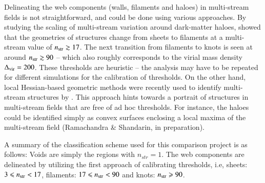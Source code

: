 Delineating the web components (walls, filaments and haloes) in multi-stream fields is not straightforward, and could be done using various approaches. By studying the scaling of multi-stream variation around dark-matter haloes, \cite{Ramachandara_Shandarin:15} showed that the geometries of structures change from sheets to filaments at a multi-stream value of $n_{\rm str} \gtrsim 17$. The next transition from filaments to knots is seen at around $n_{\rm str} \gtrsim 90$ -- which also roughly corresponds to the virial mass density $\Delta_{\rm vir} = 200$. These thresholds are heuristic -- the analysis may have to be repeated for different simulations for the calibration of thresholds. On the other hand, local Hessian-based geometric methods were recently used to identify multi-stream structures by \cite{Ramachandra2017}. This approach hints towards a portrait of structures in multi-stream fields that are free of ad hoc thresholds. For instance, the haloes could be identified simply as convex surfaces enclosing a local maxima of the multi-stream field (Ramachandra \& Shandarin, in preparation).

A summary of the classification scheme used for this comparison project is as follows: Voids are simply the regions with $n_{str} = 1$. The web components are delineated by utilizing the first approach of calibrating thresholds, i.e, sheets: $3 \leq n_{\rm str} < 17$, filaments: $ 17 \leq n_{\rm str} < 90$ and knots: $n_{\rm str} \geq 90$.


